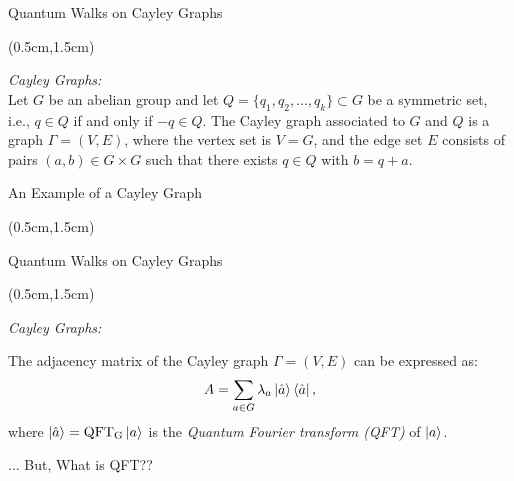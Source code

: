 \documentclass{beamer}
\theoremstyle{definition}
\begin{document}
\begin{frame}{Quantum Walks on Cayley Graphs}
    
    \begin{textblock*}{12cm}(0.5cm,1.5cm)
        
        \textit{Cayley Graphs:} \\
        \vspace{0.3cm}
        Let $G$ be an abelian group and let $Q = \{q_1, q_2, \dots, q_k\} \subset G$ be a symmetric set, i.e., $q \in Q$ if and only if $-q \in Q$. The Cayley graph associated to $G$ and $Q$ is a graph $\Gamma = (V, E)$, where the vertex set is $V = G$, and the edge set $E$ consists of pairs $(a, b) \in G \times G$ such that there exists $q \in Q$ with $b = q + a$. \\
      
    \end{textblock*}

\end{frame}




\begin{frame}{An Example of a Cayley Graph}
    
    \begin{textblock*}{12cm}(0.5cm,1.5cm)
        
       
    \end{textblock*}


\end{frame}




\begin{frame}{Quantum Walks on Cayley Graphs}
    
    \begin{textblock*}{12cm}(0.5cm,1.5cm)
        
        \textit{Cayley Graphs:} \\
        \vspace{0.3cm}
        
        The adjacency matrix of the Cayley graph $\Gamma = (V,E)$ can be expressed as:
        \[ A = \sum_{a \in G} \lambda_a \ket{\hat{a}} \bra{\hat{a}}, \]
        where $\ket{\hat{a}} = \operatorname{QFT_G} \ket{a}$ is the \textit{Quantum Fourier transform (QFT)} of $\ket{a}$. \\
         \vspace{0.5cm}

        \vspace{2cm}
        
        ... But, What is QFT??
    \end{textblock*}


\end{frame}
\end{document}
